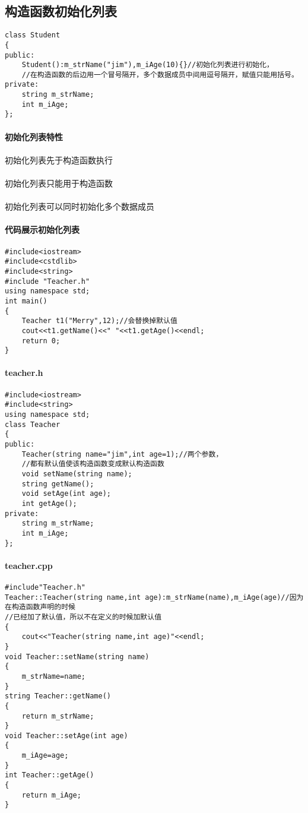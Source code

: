 \documentclass{article}
\begin{document}
\begin{CJK}{UTF8}{gbsn}
\section{构造函数初始化列表}
\begin{verbatim}
class Student
{
public:
	Student():m_strName("jim"),m_iAge(10){}//初始化列表进行初始化，
	//在构造函数的后边用一个冒号隔开，多个数据成员中间用逗号隔开，赋值只能用括号。
private:
	string m_strName;
	int m_iAge;
};
\end{verbatim}
\paragraph{初始化列表特性}
\paragraph{}
初始化列表先于构造函数执行
\paragraph{}
初始化列表只能用于构造函数
\paragraph{}
初始化列表可以同时初始化多个数据成员
\paragraph{代码展示初始化列表}
\begin{verbatim}
#include<iostream>
#include<cstdlib>
#include<string>
#include "Teacher.h"
using namespace std;
int main()
{
	Teacher t1("Merry",12);//会替换掉默认值
	cout<<t1.getName()<<" "<<t1.getAge()<<endl;
	return 0;
}
\end{verbatim}
\paragraph{teacher.h}
\begin{verbatim}
#include<iostream>
#include<string>
using namespace std;
class Teacher
{
public:
	Teacher(string name="jim",int age=1);//两个参数，
	//都有默认值使该构造函数变成默认构造函数
	void setName(string name);
	string getName();
	void setAge(int age);
	int getAge();
private:
	string m_strName;
	int m_iAge;
};
\end{verbatim}
\paragraph{teacher.cpp}
\begin{verbatim}
#include"Teacher.h"
Teacher::Teacher(string name,int age):m_strName(name),m_iAge(age)//因为在构造函数声明的时候
//已经加了默认值，所以不在定义的时候加默认值
{
	cout<<"Teacher(string name,int age)"<<endl;
}
void Teacher::setName(string name)
{
	m_strName=name;
}
string Teacher::getName()
{
	return m_strName;
}
void Teacher::setAge(int age)
{
	m_iAge=age;
}
int Teacher::getAge()
{
	return m_iAge;
}
\end{verbatim}

\end{CJK}
\end{document}
